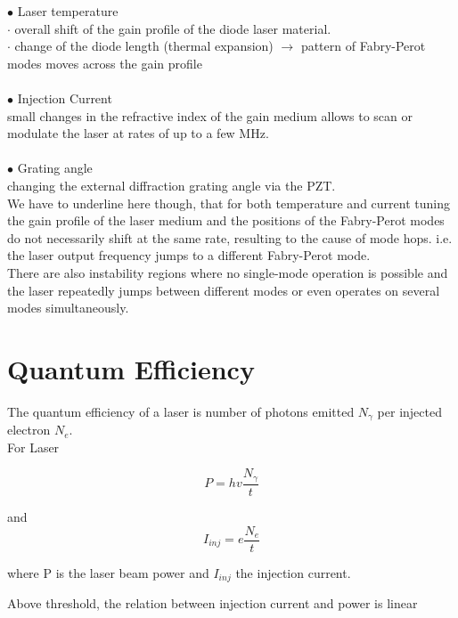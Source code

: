\documentclass[openany,11pt,a4paper]{book}
\begin{document}
$\bullet$  Laser temperature\\
$\cdot$ overall shift of the gain profile of the diode laser material.\\
$\cdot$ change of the diode length (thermal expansion) $\rightarrow$ pattern of Fabry-Perot modes moves across the gain profile\\\\


$\bullet$  Injection Current\\ 
small changes in the refractive index of the gain medium allows to scan or modulate the laser at rates of up to a few MHz.\\ \\

$\bullet $  Grating angle\\
changing the external diffraction grating angle via the PZT.\\ 



We have to underline here though, that for both temperature and current tuning the gain profile of the laser
medium and the positions of the Fabry-Perot modes do not necessarily shift at the same rate, resulting to the cause of mode hops. i.e. the laser output frequency jumps to a different Fabry-Perot mode.\\
There are also instability regions where no single-mode operation is possible and the laser repeatedly jumps between different modes or even operates on several modes simultaneously. 





\section{Quantum Efficiency}
 
The quantum efficiency of a laser is number of photons emitted $N_{\gamma}$ per injected
electron $ N_{e}$.\\
For Laser 

\begin{equation}
 P=hv \dfrac{N_{\gamma}}{t}
\end{equation}

 and 
\begin{equation}
 I_{inj} = e \dfrac{N_{e}}{t}
\end{equation}


where P is the laser beam power and $I_{inj}$ the injection current. 

Above threshold, the relation between injection current and power is linear
\end{document}
